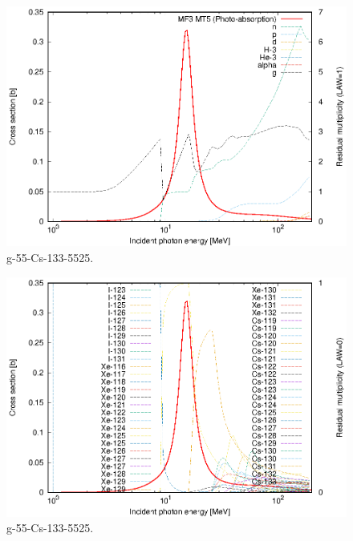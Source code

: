 \begin{figure}
 \includegraphics[width=\linewidth]{eps/g_55-Cs-133_5525.eps}
  \caption{g-55-Cs-133-5525.}
\end{figure}
\begin{figure}
 \includegraphics[width=\linewidth]{eps-law0/g_55-Cs-133_5525.eps}
 \caption{g-55-Cs-133-5525.}
\end{figure}
\newpage \clearpage

